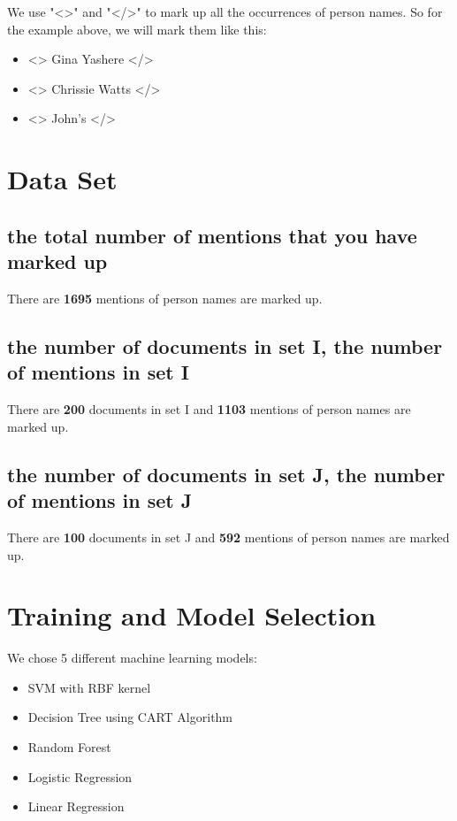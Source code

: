 \documentclass{article}
\begin{document}
We use "\textless\textgreater" and "\textless/\textgreater"  to mark up all the occurrences of person names. So for the example above, we will mark them like this:

\begin{itemize}
\setlength\itemsep{0.01em}
\item <> Gina Yashere </>
\item <> Chrissie Watts </>
\item <> John's </>
\end{itemize}

\section{Data Set}
\subsection{the total number of mentions that you have marked up}

There are \textbf{1695} mentions of person names are marked up.

\subsection{the number of documents in set I, the number of mentions in set I}

There are \textbf{200} documents in set I and \textbf{1103 }mentions of person names are marked up.


\subsection{the number of documents in set J, the number of mentions in set J}

There are \textbf{100} documents in set J and \textbf{592 }mentions of person names are marked up.

\section{Training and Model Selection}

We chose 5 different machine learning models:

\begin{itemize}
\setlength\itemsep{0.01em}
\item SVM with RBF kernel
\item Decision Tree using CART Algorithm
\item Random Forest
\item Logistic Regression
\item Linear Regression
\end{itemize}
\end{document}
